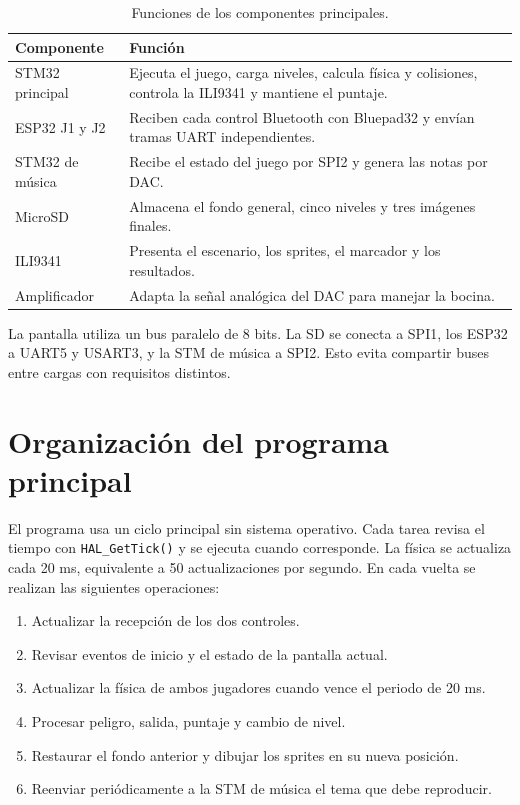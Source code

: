 \documentclass[11pt,letterpaper]{article}
\begin{document}
\begin{table}[h]
\centering
\caption{Funciones de los componentes principales.}
\begin{tabularx}{\textwidth}{@{}lY@{}}
\toprule
\textbf{Componente} & \textbf{Función} \\
\midrule
STM32 principal & Ejecuta el juego, carga niveles, calcula física y colisiones,
controla la ILI9341 y mantiene el puntaje. \\
ESP32 J1 y J2 & Reciben cada control Bluetooth con Bluepad32 y envían tramas UART
independientes. \\
STM32 de música & Recibe el estado del juego por SPI2 y genera las notas por DAC. \\
MicroSD & Almacena el fondo general, cinco niveles y tres imágenes finales. \\
ILI9341 & Presenta el escenario, los sprites, el marcador y los resultados. \\
Amplificador & Adapta la señal analógica del DAC para manejar la bocina. \\
\bottomrule
\end{tabularx}
\end{table}

La pantalla utiliza un bus paralelo de 8 bits. La SD se conecta a SPI1, los ESP32 a
UART5 y USART3, y la STM de música a SPI2. Esto evita compartir buses entre cargas
con requisitos distintos.

\section{Organización del programa principal}

El programa usa un ciclo principal sin sistema operativo. Cada tarea revisa el
tiempo con \texttt{HAL\_GetTick()} y se ejecuta cuando corresponde. La física se
actualiza cada 20 ms, equivalente a 50 actualizaciones por segundo. En cada vuelta se
realizan las siguientes operaciones:

\begin{enumerate}[leftmargin=1.6em,itemsep=0.2em]
  \item Actualizar la recepción de los dos controles.
  \item Revisar eventos de inicio y el estado de la pantalla actual.
  \item Actualizar la física de ambos jugadores cuando vence el periodo de 20 ms.
  \item Procesar peligro, salida, puntaje y cambio de nivel.
  \item Restaurar el fondo anterior y dibujar los sprites en su nueva posición.
  \item Reenviar periódicamente a la STM de música el tema que debe reproducir.
\end{enumerate}
\end{document}
